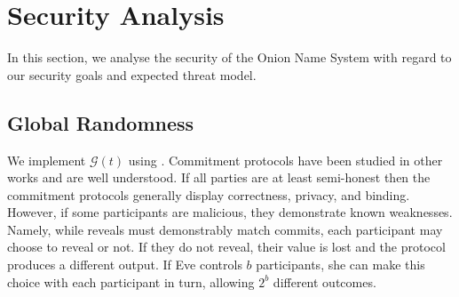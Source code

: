 \documentclass[USenglish,oneside,twocolumn]{article}
\begin{document}
%
%
%
%

\section{Security Analysis}
\label{sec:Analysis}

In this section, we analyse the security of the Onion Name System with regard to our security goals and expected threat model. 

\subsection{Global Randomness} %

We implement $ \mathcal{G}(t) $ using \cite{GouletCommitReveal}. Commitment protocols have been studied in other works \cite{rivest1999unconditionally, naor1990bit} and are well understood. If all parties are at least semi-honest then the commitment protocols generally display correctness, privacy, and binding. However, if some participants are malicious, they demonstrate known weaknesses. Namely, while reveals must demonstrably match commits, each participant may choose to reveal or not. If they do not reveal, their value is lost and the protocol produces a different output. If Eve controls $ b $ participants, she can make this choice with each participant in turn, allowing $ 2^{b} $ different outcomes.
\end{document}

